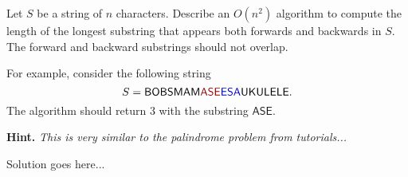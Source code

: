 \documentclass{article}
\begin{document}
\begin{question}
Let $S$ be a string of $n$ characters. Describe an $O(n^2)$ algorithm to compute the length of the longest substring that appears both forwards and backwards in $S$. The forward and backward substrings should not overlap.

For example, consider the following string \[S = \mathsf{BOBSMAM\textcolor{red!60!black}{ASE}\textcolor{blue!80!black}{ESA}UKULELE}.\] The algorithm should return 3 with the substring $\mathsf{ASE}$.

{\bfseries Hint.} {\em This is very similar to the palindrome problem from tutorials...}
\end{question}

\begin{solution}
Solution goes here...
\end{solution}
\end{document}
